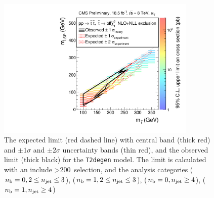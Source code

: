 \begin{figure}[h!]
\centering
\includegraphics[width=0.85\textwidth]{Figs/sms/t2degen/limit_v0/T2degen_toys_XSEC.pdf}
\caption{The expected limit (red dashed line) with central band (thick red)
and $\pm1\sigma$ and $\pm2\sigma$ uncertainty bands (thin red), and the
observed limit (thick black) for the \texttt{T2degen} model. The limit is
calculated with an include \HT>200~\gev selection, and the analysis categories 
($n_{\text{b}} = 0, 2\leq n_{\text{jet}}\leq3$), ($n_{\text{b}} = 1, 2\leq n_{\text{jet}}\leq3$), ($n_{\text{b}} = 0, n_{\text{jet}} \geq 4$), ($n_{\text{b}} = 1,
n_{\text{jet}} \geq 4$)}
\label{fig:t2degen_limit}
\end{figure}

